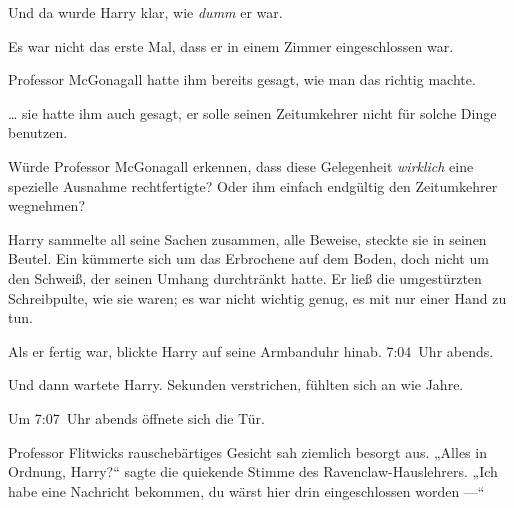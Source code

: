Und da wurde Harry klar, wie \emph{dumm} er war.

Es war nicht das erste Mal, dass er in einem Zimmer eingeschlossen war.

Professor McGonagall hatte ihm bereits gesagt, wie man das richtig machte.

… sie hatte ihm auch gesagt, er solle seinen Zeitumkehrer nicht für solche Dinge benutzen.

Würde Professor McGonagall erkennen, dass diese Gelegenheit \emph{wirklich} eine spezielle Ausnahme rechtfertigte? Oder ihm einfach endgültig den Zeitumkehrer wegnehmen?

Harry sammelte all seine Sachen zusammen, alle Beweise, steckte sie in seinen Beutel. Ein  kümmerte sich um das Erbrochene auf dem Boden, doch nicht um den Schweiß, der seinen Umhang durchtränkt hatte. Er ließ die umgestürzten Schreibpulte, wie sie waren; es war nicht wichtig genug, es mit nur einer Hand zu tun.

Als er fertig war, blickte Harry auf seine Armbanduhr hinab. 7:04~Uhr abends.

Und dann wartete Harry. Sekunden verstrichen, fühlten sich an wie Jahre.

Um 7:07~Uhr abends öffnete sich die Tür.

Professor Flitwicks rauschebärtiges Gesicht sah ziemlich besorgt aus.
„Alles in Ordnung, Harry?“ sagte die quiekende Stimme des Ravenclaw-Hauslehrers.
„Ich habe eine Nachricht bekommen, du wärst hier drin eingeschlossen worden —“

